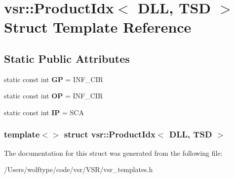 \hypertarget{structvsr_1_1_product_idx_3_01_d_l_l_00_01_t_s_d_01_4}{\section{vsr\-:\-:Product\-Idx$<$ D\-L\-L, T\-S\-D $>$ Struct Template Reference}
\label{structvsr_1_1_product_idx_3_01_d_l_l_00_01_t_s_d_01_4}
}
\subsection*{Static Public Attributes}
\begin{DoxyCompactItemize}
\item 
\hypertarget{structvsr_1_1_product_idx_3_01_d_l_l_00_01_t_s_d_01_4_af497c53f82d649d506eabd94ad36ac8c}{static const int {\bfseries G\-P} = I\-N\-F\-\_\-\-C\-I\-R}\label{structvsr_1_1_product_idx_3_01_d_l_l_00_01_t_s_d_01_4_af497c53f82d649d506eabd94ad36ac8c}

\item 
\hypertarget{structvsr_1_1_product_idx_3_01_d_l_l_00_01_t_s_d_01_4_a7f3329f6141220d2b5eadd2088facb9b}{static const int {\bfseries O\-P} = I\-N\-F\-\_\-\-C\-I\-R}\label{structvsr_1_1_product_idx_3_01_d_l_l_00_01_t_s_d_01_4_a7f3329f6141220d2b5eadd2088facb9b}

\item 
\hypertarget{structvsr_1_1_product_idx_3_01_d_l_l_00_01_t_s_d_01_4_a5aba031b38666c7a2f4be6e0684b9447}{static const int {\bfseries I\-P} = S\-C\-A}\label{structvsr_1_1_product_idx_3_01_d_l_l_00_01_t_s_d_01_4_a5aba031b38666c7a2f4be6e0684b9447}

\end{DoxyCompactItemize}
\subsubsection*{template$<$$>$ struct vsr\-::\-Product\-Idx$<$ D\-L\-L, T\-S\-D $>$}



The documentation for this struct was generated from the following file\-:\begin{DoxyCompactItemize}
\item 
/\-Users/wolftype/code/vsr/\-V\-S\-R/vsr\-\_\-templates.\-h\end{DoxyCompactItemize}
